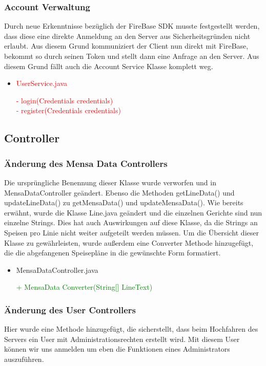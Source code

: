 \documentclass[a4paper]{scrreprt}
\begin{document}
\subsubsection{Account Verwaltung}
Durch neue Erkenntnisse bezüglich der FireBase SDK musste festgestellt werden, dass diese eine direkte Anmeldung an den Server aus Sicherheitsgründen nicht erlaubt. Aus diesem Grund kommuniziert der Client nun direkt mit FireBase, bekommt so durch seinen Token und stellt dann eine Anfrage an den Server. Aus diesem Grund fällt auch die Account Service Klasse komplett weg.

\begin{itemize}
\item\textcolor{red}{UserService.java}

\textcolor{red}{- login(Credentials credentials)}\\
\textcolor{red}{- register(Credentials credentials)}
\end{itemize}

\subsection{Controller}
\subsubsection{Änderung  des Mensa Data Controllers}
Die ursprüngliche Benennung dieser Klasse wurde verworfen und in MensaDataController geändert. Ebenso die Methoden getLineData() und updateLineData() zu getMensaData() und updateMensaData(). Wie bereits erwähnt, wurde die Klasse Line.java geändert und die einzelnen Gerichte sind nun einzelne Strings. Dies hat auch Auswirkungen auf diese Klasse, da die Strings an Speisen pro Linie nicht weiter aufgeteilt werden müssen. Um die Übersicht dieser Klasse zu gewährleisten, wurde außerdem eine Converter Methode hinzugefügt, die die abgefangenen Speisepläne in die gewünschte Form formatiert.

\begin{itemize}
\item{MensaDataController.java}

\textcolor{green}{+ MensaData Converter(String[] LineText)}\\
\end{itemize}

\subsubsection{Änderung des User Controllers}
Hier wurde eine Methode hinzugefügt, die sicherstellt, dass beim Hochfahren des Servers ein User mit Administrationsrechten erstellt wird. Mit diesem User können wir uns anmelden um eben die Funktionen eines Administrators auszuführen.
\end{document}
